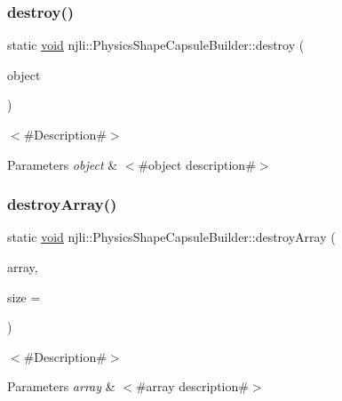 \subsubsection{\texorpdfstring{destroy()}{destroy()}}
{\footnotesize\ttfamily static \mbox{\hyperlink{_thread_8h_af1e856da2e658414cb2456cb6f7ebc66}{void}} njli\+::\+Physics\+Shape\+Capsule\+Builder\+::destroy (\begin{DoxyParamCaption}\item[{\mbox{\hyperlink{classnjli_1_1_physics_shape_capsule_builder}{Physics\+Shape\+Capsule\+Builder}} $\ast$}]{object }\end{DoxyParamCaption})\hspace{0.3cm}{\ttfamily [static]}}

$<$\#\+Description\#$>$


\begin{DoxyParams}{Parameters}
{\em object} & $<$\#object description\#$>$ \\
\hline
\end{DoxyParams}
\mbox{\label{classnjli_1_1_physics_shape_capsule_builder_ae03a51c4a693891bdfb5fae80b7c9c9e}} 
\subsubsection{\texorpdfstring{destroy\+Array()}{destroyArray()}}
{\footnotesize\ttfamily static \mbox{\hyperlink{_thread_8h_af1e856da2e658414cb2456cb6f7ebc66}{void}} njli\+::\+Physics\+Shape\+Capsule\+Builder\+::destroy\+Array (\begin{DoxyParamCaption}\item[{\mbox{\hyperlink{classnjli_1_1_physics_shape_capsule_builder}{Physics\+Shape\+Capsule\+Builder}} $\ast$$\ast$}]{array,  }\item[{const \mbox{\hyperlink{_util_8h_a10e94b422ef0c20dcdec20d31a1f5049}{u32}}}]{size = {} }\end{DoxyParamCaption})\hspace{0.3cm}{\ttfamily [static]}}

$<$\#\+Description\#$>$


\begin{DoxyParams}{Parameters}
{\em array} & $<$\#array description\#$>$ \\
\hline
\end{DoxyParams}
\mbox{\label{classnjli_1_1_physics_shape_capsule_builder_ad3c2c7ec2142d57fff20665c52213461}} 
